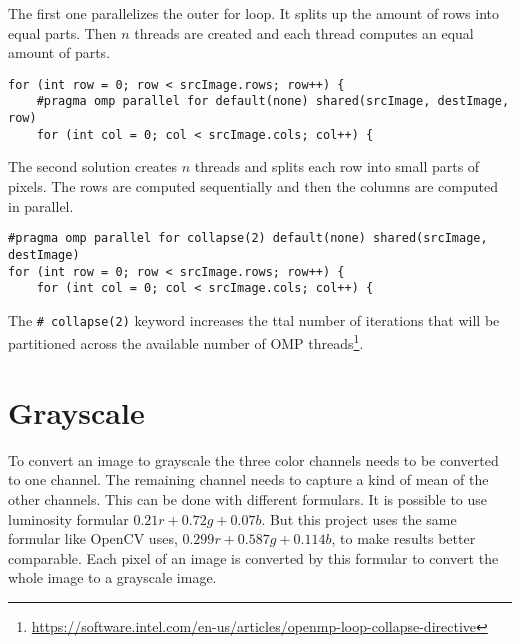 The first one parallelizes the outer for loop. It splits up the amount of rows into equal parts. Then $ n $ threads are created and each thread computes an equal amount of parts. 

\pagebreak

\begin{listing}[H]
\begin{verbatim}
for (int row = 0; row < srcImage.rows; row++) {
    #pragma omp parallel for default(none) shared(srcImage, destImage, row)
    for (int col = 0; col < srcImage.cols; col++) {
\end{verbatim}
\label{listing:forloop2}
\end{listing}


The second solution creates $ n $ threads and splits each row into small parts of pixels. The rows are computed sequentially and then the columns are computed in parallel.

\begin{listing}[H]
\begin{verbatim}
#pragma omp parallel for collapse(2) default(none) shared(srcImage, destImage)
for (int row = 0; row < srcImage.rows; row++) {
    for (int col = 0; col < srcImage.cols; col++) {
\end{verbatim}
\label{listing:forloop3}
\end{listing}


The \texttt{# collapse(2)} keyword increases the ttal number of iterations that will be partitioned across the available number of OMP threads\footnote{\url{https://software.intel.com/en-us/articles/openmp-loop-collapse-directive}}.

\section{Grayscale}


To convert an image to grayscale the three color channels needs to be converted to one channel. The remaining channel needs to capture a kind of mean of the other channels. This can be done with different formulars. It is possible to use luminosity formular $ 0.21r + 0.72g + 0.07b $. But this project uses the same formular like OpenCV uses, $ 0.299r + 0.587g + 0.114b $, to make results better comparable. Each pixel of an image is converted by this formular to convert the whole image to a grayscale image.

